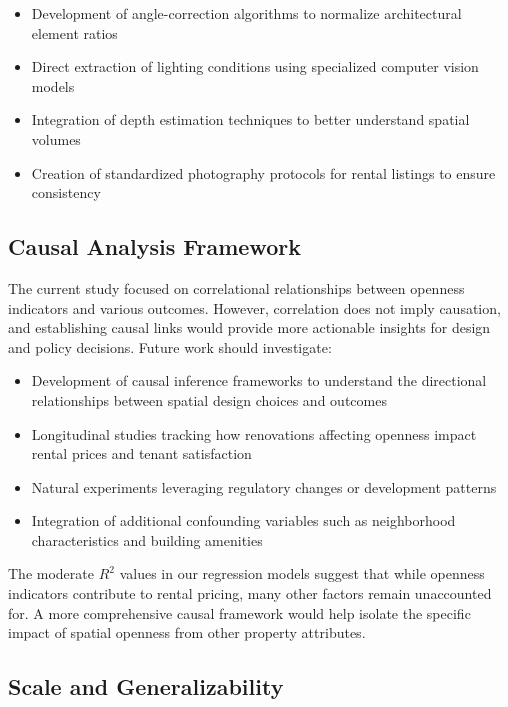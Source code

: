 \begin{itemize}
    \item Development of angle-correction algorithms to normalize architectural element ratios
    \item Direct extraction of lighting conditions using specialized computer vision models
    \item Integration of depth estimation techniques to better understand spatial volumes
    \item Creation of standardized photography protocols for rental listings to ensure consistency
\end{itemize}

\subsection{Causal Analysis Framework}

The current study focused on correlational relationships between openness indicators and various 
outcomes. However, correlation does not imply causation, and establishing causal links would provide 
more actionable insights for design and policy decisions. Future work should investigate:

\begin{itemize}
    \item Development of causal inference frameworks to understand the directional relationships 
    between spatial design choices and outcomes
    \item Longitudinal studies tracking how renovations affecting openness impact rental prices and 
    tenant satisfaction
    \item Natural experiments leveraging regulatory changes or development patterns
    \item Integration of additional confounding variables such as neighborhood characteristics and 
    building amenities
\end{itemize}

The moderate $R^2$ values in our regression models suggest that while openness indicators contribute 
to rental pricing, many other factors remain unaccounted for. A more comprehensive causal framework 
would help isolate the specific impact of spatial openness from other property attributes.

\subsection{Scale and Generalizability}


